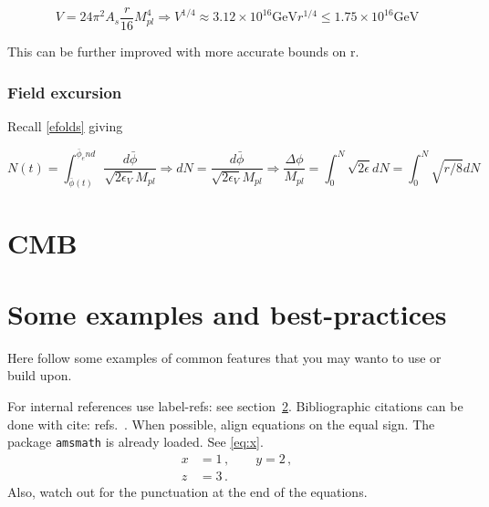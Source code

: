 \documentclass[a4paper,11pt]{article}
\newcommand{\Mp}{M_{pl}}
\newcommand{\bphi}{\bar{\phi}}
\begin{document}
\begin{equation}
V=24\pi^2A_s\frac{r}{16}\Mp^4 \Rightarrow V^{1/4} \approx 3.12\times10^{16}\text{GeV}r^{1/4} \leq 1.75\times10^{16}\text{GeV}
\end{equation}

This can be further improved with more accurate bounds on r.

\subsubsection{Field excursion}
Recall \ref{efolds} giving 

\begin{equation}
N(t) =  \int_{\bphi(t)}^{\bphi_end} \frac{d\bphi}{\sqrt{2\epsilon_V}\Mp}
\Rightarrow dN=\frac{d\bphi}{\sqrt{2\epsilon_V}\Mp}
\Rightarrow \frac{\Delta \phi}{\Mp} = \int_0^N \sqrt{2\epsilon} dN = \int_0^N \sqrt{r/8} dN 
\end{equation}



























\section{CMB}


\section{Some examples and best-practices}
\label{sec:intro}

Here follow some examples of common features that you may wanto to use
or build upon.

For internal references use label-refs: see section~\ref{sec:intro}.
Bibliographic citations can be done with cite: refs.~\cite{a,b,c}.
When possible, align equations on the equal sign. The package
\texttt{amsmath} is already loaded. See \eqref{eq:x}.
\begin{equation}
\label{eq:x}
\begin{split}
x &= 1 \,,
\qquad
y = 2 \,,
\\
z &= 3 \,.
\end{split}
\end{equation}
Also, watch out for the punctuation at the end of the equations.
\end{document}

